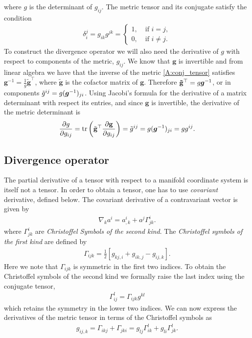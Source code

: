 where $g$ is the determinant of $g_{ij}$. The metric tensor and its conjugate
satisfy the condition
\begin{align*}
    \delta_i^j = g_{ik}g^{jk} = 
    \begin{cases}
        1,\; &\mbox{if } i = j,\\
        0,\; &\mbox{if } i\ne j.
    \end{cases}
\end{align*}
To construct the divergence operator we will also need the derivative of 
$g$ with respect to components of the metric, $g_{ij}$. We know that $\mathbf{g}$ 
is invertible and from linear algebra we have that the inverse of the metric 
\eqref{A:conj_tensor} satisfies 
$\mathbf{g}^{-1} = \frac{1}{g}\tilde{\mathbf{g}}^{\top}$, where $\mathbf{\tilde{g}}$ is the
cofactor matrix of $\mathbf{g}$. Therefore $\mathbf{\tilde{g}}^{\top} = g\mbox{\boldmath $g$}^{-1}$, 
or in components $\tilde{g}^{ij} = g(\mbox{\boldmath $g$}^{-1})_{ji}$. Using Jacobi's formula 
for the derivative of a matrix determinant with respect its entries, and since 
$\mathbf{g}$ is invertible, the derivative of the metric determinant is
\begin{align}
    \frac{\partial g}{\partial g_{ij}} = \mathrm{tr}\left(\tilde{\mathbf{g}}^{\top}\frac{\partial \mathbf{g}}{\partial g_{ij}}\right)
        = \tilde{g}^{ij} = g(\mbox{\boldmath $g$}^{-1})_{ji} = gg^{ij}.
\label{A:g_deriv}
\end{align}


\subsection{Divergence operator}
The partial derivative of a tensor with respect to a manifold coordinate system
is itself not a tensor. In order to obtain a tensor, one has to use 
\emph{covariant} derivative, defined below.
The covariant derivative of a contravariant vector is given by
\begin{align}
    \nabla_k a^i = a^i_{,k} + a^j \Gamma_{jk}^i.
    \label{A:cov_diff}
\end{align}
where $\Gamma_{jk}^i$ are \emph{Christoffel Symbols of the second kind}.
The \emph{Christoffel symbols of the first kind} are defined by
\begin{align*}
    \Gamma_{ijk} = \frac{1}{2}\left[g_{kj,i} + g_{ik,j} - g_{ij,k}\right].
\end{align*}
Here we note that $\Gamma_{ijk}$ is symmetric in the first two indices. To 
obtain the Christoffel symbols of the second kind we formally raise the 
last index using the conjugate tensor,
\begin{align}
    \Gamma_{ij}^l = \Gamma_{ijk}g^{kl}
    \label{A:CS2}
\end{align}
which retains the symmetry in the lower two indices. We can now express the
derivatives of the metric tensor in terms of the Christoffel symbols as
\begin{align*}
    g_{ij,k} = \Gamma_{ikj} + \Gamma_{jki} 
             = g_{lj}\Gamma_{ik}^l + g_{li}\Gamma_{jk}^l.
\end{align*}

